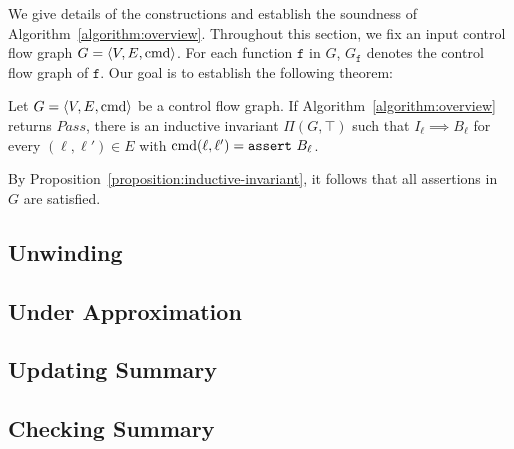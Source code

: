 
We give details of the constructions and establish the soundness of
Algorithm~\ref{algorithm:overview}. Throughout this section, we fix an
input control flow graph $G = \langle V, E, \textmd{cmd} \rangle$. For
each function $\mathtt{f}$ in $G$, $G_{\mathtt{f}}$ denotes the
control flow graph of $\mathtt{f}$. Our goal is to establish the
following theorem:

\begin{theorem}
  Let $G = \langle V, E, \textmd{cmd} \rangle$ be a control flow
  graph. If Algorithm~\ref{algorithm:overview} returns
  $\mathit{Pass}$, there is an inductive invariant $\Pi (G, \top)$
  such that $I_{\ell} \implies B_{\ell}$ for every $(\ell, \ell') \in
  E$ with $\textmd{cmd} (\ell, \ell') = \mathtt{assert\ } B_{\ell}$.
  \label{theorem:soundness}
\end{theorem}

By Proposition~\ref{proposition:inductive-invariant}, it follows that
all assertions in $G$ are satisfied.

\subsection{Unwinding}
\label{subsection:unwinding}


\subsection{Under Approximation}
\label{subsection:under-approximation}


\subsection{Updating Summary}
\label{subsection:updating-summary}


\subsection{Checking Summary}
\label{subsection:checking-summary}


